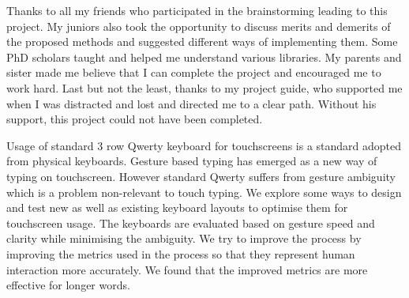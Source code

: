 \documentclass[MTech]{iitmdiss}
\begin{document}
Thanks to all my friends who participated in the brainstorming leading to this project. My juniors also took the opportunity to discuss merits and demerits of the proposed methods and suggested different ways of implementing them. Some PhD scholars taught and helped me understand various libraries. My parents and sister made me believe that I can complete the project and encouraged me to work hard. Last but not the least, thanks to my project guide, who supported me when I was distracted and lost and directed me to a clear path. Without his support, this project could not have been completed.


\abstract
\noindent Usage of standard 3 row Qwerty keyboard for touchscreens is a standard adopted from physical keyboards. Gesture based typing has emerged as a new way of typing on touchscreen. However standard Qwerty suffers from gesture ambiguity which is a problem non-relevant to touch typing. We explore some ways to design and test new as well as existing keyboard layouts to optimise them for touchscreen usage. The keyboards are evaluated based on gesture speed and clarity while minimising the ambiguity. We try to improve the process by improving the metrics used in the process so that they represent human interaction more accurately. We found that the improved metrics are more effective for longer words.

\pagebreak


\begin{singlespace}
\tableofcontents
\thispagestyle{empty}

\listoffigures
{}
\end{singlespace}



\end{document}
